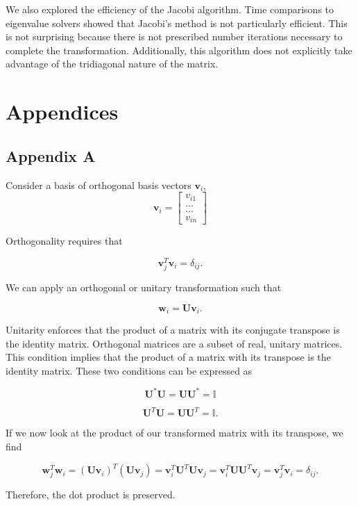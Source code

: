 \documentclass[%
oneside,                 %
final,                   %
10pt]{article}
\begin{document}
We also explored the efficiency of the Jacobi algorithm. Time comparisons to eigenvalue solvers showed that Jacobi's method is not particularly efficient.  This is not surprising because there is not prescribed number iterations necessary to complete the transformation.  Additionally, this algorithm does not explicitly take advantage of the tridiagonal nature of the matrix.

\section{Appendices}

\subsection{Appendix A} \label{A}

Consider a basis of orthogonal basis vectors $\mathbf{v}_i$,
\[
\mathbf{v}_i = \begin{bmatrix} v_{i1} \\ \dots \\ \dots \\v_{in} \end{bmatrix}
\]

Orthogonality requires that 

\[
\mathbf{v}_j^T\mathbf{v}_i = \delta_{ij}.
\]

We can apply an orthogonal or unitary transformation such that

\[
\mathbf{w}_i=\mathbf{U}\mathbf{v}_i.
\]

Unitarity enforces that the product of a matrix with its conjugate transpose is the identity matrix.  Orthogonal matrices are a subset of real, unitary matrices.  This condition implies that the product of a matrix with its transpose is the identity matrix.  These two conditions can be expressed as

\[
\mathbf{U}^* \mathbf{U} = \mathbf{U} \mathbf{U}^* = \mathbb{I}
\]

\[
\mathbf{U}^T \mathbf{U} = \mathbf{U} \mathbf{U}^T = \mathbb{I}.
\]

If we now look at the product of our transformed matrix with its transpose, we find

\[
\mathbf{w}^T_j\mathbf{w}_i = (\mathbf{U}\mathbf{v}_i)^T(\mathbf{U}\mathbf{v}_j)= \mathbf{v}_i^T\mathbf{U}^T\mathbf{U}\mathbf{v}_j=\mathbf{v}_i^T\mathbf{U}\mathbf{U}^T\mathbf{v}_j =\mathbf{v}_j^T\mathbf{v}_i = \delta_{ij}.
\]

Therefore, the dot product is preserved.
\end{document}
